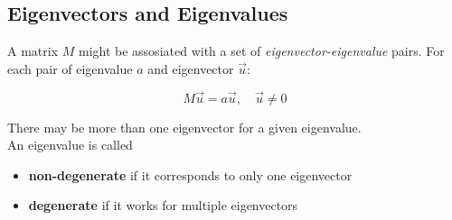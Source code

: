 \documentclass{article}
\begin{document}
\subsection{Eigenvectors and Eigenvalues}

A matrix \(M\) might be assosiated with a set of \textit{eigenvector-eigenvalue} pairs.
For each pair of eigenvalue \(a\) and eigenvector \(\vec{u}\):

\[
    M\vec{u}=a\vec{u},
    \quad\vec{u}\neq 0
\]

There may be more than one eigenvector for a given eigenvalue. \\
An eigenvalue is called
\begin{itemize}
    \item \textbf{non-degenerate} if it corresponds to only one eigenvector
    \item \textbf{degenerate} if it works for multiple eigenvectors
\end{itemize}

\pagebreak

\nocite{*} %

\printbibliography
\end{document}
